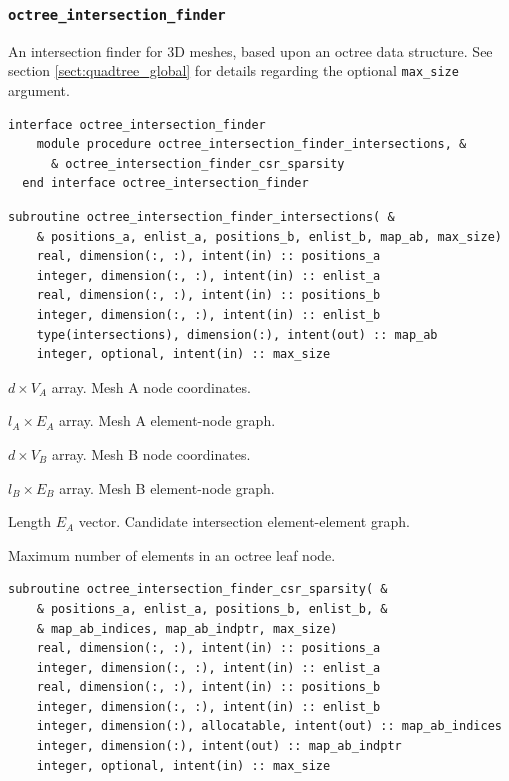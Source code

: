 \documentclass{article}
\begin{document}
\subsubsection{\texttt{octree\_intersection\_finder}}\label{sect:octree_global}

An intersection finder for 3D meshes, based upon an octree data structure. See
section \ref{sect:quadtree_global} for details regarding the optional
\verb+max_size+ argument.

\begin{lstlisting}[language=FORTRAN]  
  interface octree_intersection_finder
    module procedure octree_intersection_finder_intersections, &
      & octree_intersection_finder_csr_sparsity
  end interface octree_intersection_finder
\end{lstlisting}

\begin{lstlisting}[language=FORTRAN]
  subroutine octree_intersection_finder_intersections( &
    & positions_a, enlist_a, positions_b, enlist_b, map_ab, max_size)
    real, dimension(:, :), intent(in) :: positions_a
    integer, dimension(:, :), intent(in) :: enlist_a
    real, dimension(:, :), intent(in) :: positions_b
    integer, dimension(:, :), intent(in) :: enlist_b
    type(intersections), dimension(:), intent(out) :: map_ab
    integer, optional, intent(in) :: max_size
\end{lstlisting}

\begin{description}[font=\ttfamily\bfseries,leftmargin=2.2\parindent,labelindent=1.7\parindent,noitemsep]
  \item[positions\_a] $d \times V_A$ array. Mesh A node coordinates.
  \item[enlist\_a] $l_A \times E_A$ array. Mesh A element-node graph.
  \item[positions\_b] $d \times V_B$ array. Mesh B node coordinates.
  \item[enlist\_b] $l_B \times E_B$ array. Mesh B element-node graph.
  \item[map\_ab] Length $E_A$ vector. Candidate intersection element-element
    graph.
  \item[max\_size] Maximum number of elements in an octree leaf node.
\end{description}
  
\begin{lstlisting}[language=FORTRAN]
  subroutine octree_intersection_finder_csr_sparsity( &
    & positions_a, enlist_a, positions_b, enlist_b, &
    & map_ab_indices, map_ab_indptr, max_size)
    real, dimension(:, :), intent(in) :: positions_a
    integer, dimension(:, :), intent(in) :: enlist_a
    real, dimension(:, :), intent(in) :: positions_b
    integer, dimension(:, :), intent(in) :: enlist_b
    integer, dimension(:), allocatable, intent(out) :: map_ab_indices
    integer, dimension(:), intent(out) :: map_ab_indptr
    integer, optional, intent(in) :: max_size
\end{lstlisting}
\end{document}
